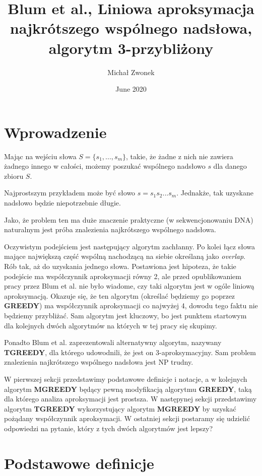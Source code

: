 \documentclass[12pt]{article}
\title{Blum et al., Liniowa aproksymacja najkrótszego wspólnego nadsłowa, algorytm 3-przybliżony}
\author{Michał Zwonek}
\date{June 2020}
\theoremstyle{definition}
\begin{document}
\maketitle

\section*{Wprowadzenie}

Mając na wejściu słowa $S = \{s_1,...,s_m\}$, takie, że żadne z nich nie zawiera żadnego innego w całości, możemy poszukać wspólnego nadsłowo $s$ dla danego zbioru $S$.

Najprostszym przykładem może być słowo $s=s_1s_2...s_m$. Jednakże, tak uzyskane nadsłowo będzie niepotrzebnie długie.

Jako, że problem ten ma duże znaczenie praktyczne (w sekwencjonowaniu DNA) naturalnym jest próba znalezienia najkrótszego wspólnego nadsłowa.

Oczywistym podejściem jest następujący algorytm zachłanny. Po kolei łącz słowa mające największą część wspólną nachodzącą na siebie określaną jako \textit{overlap}. Rób tak, aż do uzyskania 
jednego słowa. Postawiona jest hipoteza, że takie podejście ma współczynnik aproksymacji równy 2, ale przed opublikowaniem pracy przez Blum et al. nie było wiadome, czy taki algorytm jest w ogóle liniową aproksymacją. Okazuje się, że ten algorytm (określać będziemy go poprzez \textbf{GREEDY}) ma współczynnik aproksymacji co najwyżej 4, dowodu tego faktu nie będziemy przybliżać. Sam algorytm jest kluczowy, bo jest punktem startowym dla kolejnych dwóch algorytmów na których w tej pracy się skupimy.

Ponadto Blum et al. zaprezentowali alternatywny algorytm, nazywany \textbf{TGREEDY}, dla którego udowodnili, że jest on 3-aproksymacyjny. Sam problem znalezienia najkrótszego wspólnego nadsłowa jest NP trudny.

W pierwszej sekcji przedstawimy podstawowe definicje i notacje, a w kolejnych algorytm \textbf{MGREEDY} będący pewną modyfikacją algorytmu \textbf{GREEDY}, taką dla którego analiza aproksymacji jest prostsza. W następynej sekcji przedstawimy algorytm 
\textbf{TGREEDY} wykorzystujący algorytm \textbf{MGREEDY} by uzyskać pożądany współczynnik aproksymacji. W ostatniej sekcji postaramy się udzielić odpowiedzi na pytanie, który z tych dwóch algorytmów jest lepszy? \pagebreak
\section*{Podstawowe definicje}
\end{document}

